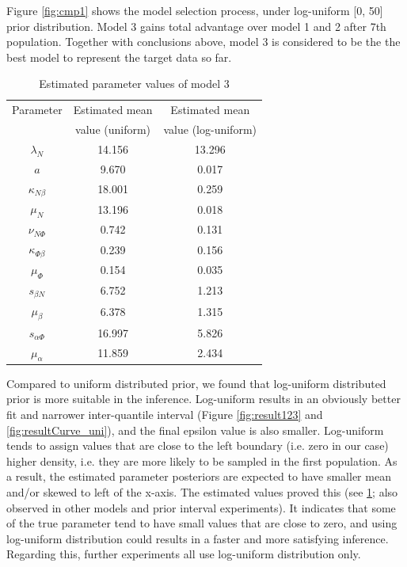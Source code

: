 \documentclass[12pt,a4paper]{report}
\begin{document}
Figure \ref{fig:cmp1} shows the model selection process, under log-uniform [0, 50] prior distribution. Model 3 gains total advantage over model 1 and 2 after 7th population. Together with conclusions above, model 3 is considered to be the the best model to represent the target data so far.
 


\begin{table}[t!]
    \centering
    \begin{tabular}{|c c c|} 
     \hline
     Parameter & Estimated mean  & Estimated mean  \\ 
      & value (uniform) &value (log-uniform) \\[0.5ex] 
     \hline\hline
     $\lambda_N$ & 14.156 & 13.296  \\ 
     $a$ & 9.670 & 0.017  \\ 
     $\kappa_{N\beta}$ & 18.001 & 0.259 \\
     $\mu_N$ & 13.196 & 0.018 \\
     $\nu_{N\Phi}$ & 0.742 & 0.131 \\
     \hline
     $\kappa_{\Phi\beta}$ & 0.239 & 0.156 \\
     $\mu_\Phi$ & 0.154 & 0.035 \\
     \hline
     $s_{\beta N}$ & 6.752 & 1.213 \\
     $\mu_\beta$ & 6.378 & 1.315 \\
     \hline
     $s_{\alpha\Phi}$ & 16.997 & 5.826 \\
     $\mu_\alpha$ & 11.859 & 2.434\\
     \hline
    \end{tabular}
    \caption{Estimated parameter values of model 3}
    \label{table:estimated1}
\end{table}

Compared to uniform distributed prior, we found that log-uniform distributed prior is more suitable in the inference. Log-uniform results in an obviously better fit and narrower inter-quantile interval (Figure \ref{fig:result123} and \ref{fig:resultCurve_uni}), and the final epsilon value is also smaller. Log-uniform tends to assign values that are close to the left boundary (i.e. zero in our case) higher density, i.e. they are more likely to be sampled in the first population. As a result, the estimated parameter posteriors are expected to have smaller mean and/or skewed to left of the x-axis. The estimated values proved this (see \ref{table:estimated1}; also observed in other models and prior interval experiments). It indicates that some of the true parameter tend to have small values that are close to zero, and using log-uniform distribution could results in a faster and more satisfying inference. Regarding this, further experiments all use log-uniform distribution only.
\end{document}
